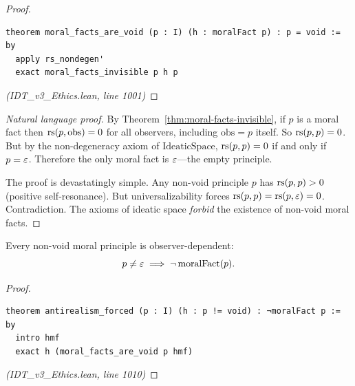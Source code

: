 \begin{proof}
\begin{lstlisting}
theorem moral_facts_are_void (p : I) (h : moralFact p) : p = void := by
  apply rs_nondegen'
  exact moral_facts_invisible p h p
\end{lstlisting}
\textit{(IDT\_v3\_Ethics.lean, line 1001)}
\end{proof}

\begin{proof}[Natural language proof]
By Theorem~\ref{thm:moral-facts-invisible}, if $p$ is a moral fact then
$\mathrm{rs}(p, \mathrm{obs}) = 0$ for all observers, including $\mathrm{obs} = p$
itself. So $\mathrm{rs}(p, p) = 0$. But by the non-degeneracy axiom of
$\mathrm{IdeaticSpace}$, $\mathrm{rs}(p, p) = 0$ if and only if $p = \varepsilon$.
Therefore the only moral fact is $\varepsilon$---the empty principle.

The proof is devastatingly simple. Any non-void principle $p$ has
$\mathrm{rs}(p, p) > 0$ (positive self-resonance). But universalizability forces
$\mathrm{rs}(p, p) = \mathrm{rs}(p, \varepsilon) = 0$. Contradiction. The axioms of ideatic space
\emph{forbid} the existence of non-void moral facts.
\end{proof}

\begin{theorem}
\label{thm:antirealism-forced}
Every non-void moral principle is observer-dependent:
\[
  p \neq \varepsilon \implies \neg\, \mathrm{moralFact}(p).
\]
\end{theorem}

\begin{proof}
\begin{lstlisting}
theorem antirealism_forced (p : I) (h : p != void) : ¬moralFact p := by
  intro hmf
  exact h (moral_facts_are_void p hmf)
\end{lstlisting}
\textit{(IDT\_v3\_Ethics.lean, line 1010)}
\end{proof}

